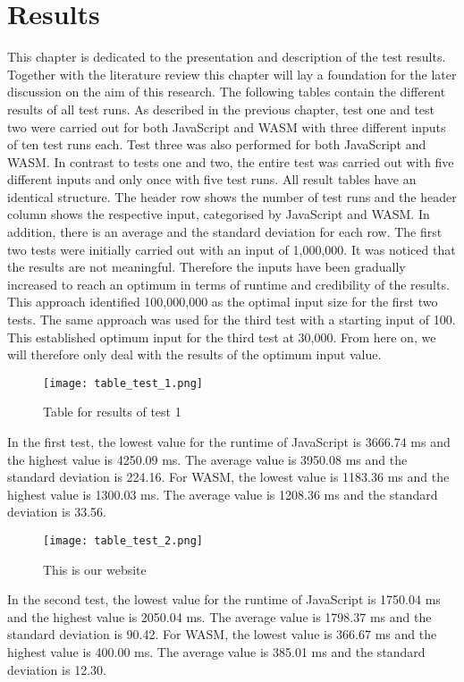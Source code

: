 \newpage
\section{Results} \label{results}
This chapter is dedicated to the presentation and description of the test results. Together with the literature review this chapter will lay a foundation for the later discussion on the aim of this research. The following tables contain the different results of all test runs. As described in the previous chapter, test one and test two were carried out for both JavaScript and WASM with three different inputs of ten test runs each. Test three was also performed for both JavaScript and WASM. In contrast to tests one and two, the entire test was carried out with five different inputs and only once with five test runs.
All result tables have an identical structure. The header row shows the number of test runs and the header column shows the respective input, categorised by JavaScript and WASM. In addition, there is an average and the standard deviation for each row. The first two tests were initially carried out with an input of 1,000,000. It was noticed that the results are not meaningful. Therefore the inputs have been gradually increased to reach an optimum in terms of runtime and credibility of the results. This approach identified 100,000,000 as the optimal input size for the first two tests. The same approach was used for the third test with a starting input of 100. This established optimum input for the third test at 30,000. From here on, we will therefore only deal with the results of the optimum input value.
\begin{figure}[H]
    \centering
    \caption[]{Table for results of test 1}
	\label{fig:tableTest1}
    \texttt{[image: table\_test\_1.png]}
\end{figure}
In the first test, the lowest value for the runtime of JavaScript is 3666.74 ms and the highest value is 4250.09 ms. The average value is 3950.08 ms and the standard deviation is 224.16. For WASM, the lowest value is 1183.36 ms and the highest value is 1300.03 ms. The average value is 1208.36 ms and the standard deviation is 33.56.
\begin{figure}[H]
    \centering
    \caption[]{This is our website}
	\label{fig:tableTest2}
    \texttt{[image: table\_test\_2.png]}
\end{figure}
In the second test, the lowest value for the runtime of JavaScript is 1750.04 ms and the highest value is 2050.04 ms. The average value is 1798.37 ms and the standard deviation is 90.42. For WASM, the lowest value is 366.67 ms and the highest value is 400.00 ms. The average value is 385.01 ms and the standard deviation is 12.30.
